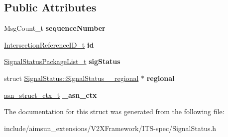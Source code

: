 \subsection*{Public Attributes}
\begin{DoxyCompactItemize}
\item 
Msg\+Count\+\_\+t {\bfseries sequence\+Number}\hypertarget{structSignalStatus_a524b000b15989958eab1461e2d9ecaf2}{}\label{structSignalStatus_a524b000b15989958eab1461e2d9ecaf2}

\item 
\hyperlink{structIntersectionReferenceID}{Intersection\+Reference\+I\+D\+\_\+t} {\bfseries id}\hypertarget{structSignalStatus_aba75b2b7485c084a95c375781016a883}{}\label{structSignalStatus_aba75b2b7485c084a95c375781016a883}

\item 
\hyperlink{structSignalStatusPackageList}{Signal\+Status\+Package\+List\+\_\+t} {\bfseries sig\+Status}\hypertarget{structSignalStatus_a6326e09bb348253ad2040ae1fdcc2345}{}\label{structSignalStatus_a6326e09bb348253ad2040ae1fdcc2345}

\item 
struct \hyperlink{structSignalStatus_1_1SignalStatus____regional}{Signal\+Status\+::\+Signal\+Status\+\_\+\+\_\+regional} $\ast$ {\bfseries regional}\hypertarget{structSignalStatus_a8286d51a9d1ba297ce055a177704f29a}{}\label{structSignalStatus_a8286d51a9d1ba297ce055a177704f29a}

\item 
\hyperlink{structasn__struct__ctx__s}{asn\+\_\+struct\+\_\+ctx\+\_\+t} {\bfseries \+\_\+asn\+\_\+ctx}\hypertarget{structSignalStatus_a29af723afe053d460287550d28a96d12}{}\label{structSignalStatus_a29af723afe053d460287550d28a96d12}

\end{DoxyCompactItemize}


The documentation for this struct was generated from the following file\+:\begin{DoxyCompactItemize}
\item 
include/aimsun\+\_\+extensions/\+V2\+X\+Framework/\+I\+T\+S-\/spec/Signal\+Status.\+h\end{DoxyCompactItemize}

